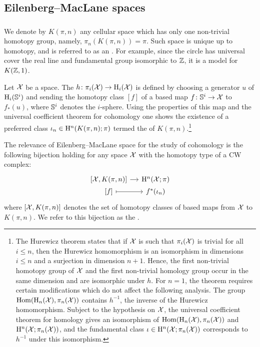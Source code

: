 \subsection{Eilenberg--MacLane spaces}

\subsubsection{}

We denote by $K(\pi, n)$ any cellular space which has only one non-trivial homotopy group, namely, $\pi_n(K(\pi, n)) = \pi$.
Such space is unique up to homotopy, and is referred to as an .
For example, since the circle has universal cover the real line and fundamental group isomorphic to $\mathbb{Z}$, it is a model for $K(\mathbb{Z},1)$.

Let $\mathcal{X}$ be a space.
The  $h \colon \pi_i(\mathcal{X}) \to \mathrm{H}_i(\mathcal{X})$ is defined by choosing a generator $u$ of $\mathrm{H}_i(\mathbb{S}^i)$ and sending the homotopy class $[f]$ of a based map $f \colon \mathbb{S}^i \to \mathcal{X}$ to $f_*(u)$, where $\mathbb{S}^i$ denotes the $i$-sphere.
Using the properties of this map and the universal coefficient theorem for cohomology one shows the existence of a preferred class $\iota_n \in \mathrm{H}^n(K(\pi, n); \pi)$ termed the  of $K(\pi, n)$.\footnote{The Hurewicz theorem states that if $\mathcal{X}$ is such that $\pi_i(\mathcal{X})$ is trivial for all $i \leq n$, then the Hurewicz homomorphism is an isomorphism in dimensions $i \leq n$ and a surjection in dimension $n+1$.
	Hence, the first non-trivial homotopy group of $\mathcal{X}$ and the first non-trivial homology group occur in the same dimension and are isomorphic under $h$.
	For $n=1$, the theorem requires certain modifications which do not affect the following analysis.
	The group $\mathrm{Hom}(\mathrm{H}_n(\mathcal{X}), \pi_n(\mathcal{X}))$ contains $h^{-1}$, the inverse of the Hurewicz homomorphism.
	Subject to the hypothesis on $\mathcal{X}$, the universal coefficient theorem for homology gives an isomorphism of $\mathrm{Hom}(\mathrm{H}_n(\mathcal{X}), \pi_n(\mathcal{X}))$ and $\mathrm{H}^n(\mathcal{X}; \pi_n(\mathcal{X}))$, and the fundamental class $\iota \in \mathrm{H}^n(\mathcal{X}; \pi_n(\mathcal{X}))$ corresponds to $h^{-1}$ under this isomorphism.}

The relevance of Eilenberg--MacLane space for the study of cohomology is the following bijection holding for any space \(\mathcal{X}\) with the homotopy type of a CW complex:
\[
\begin{tikzcd}[column sep=small, row sep=0]
	{[\cX, K(\pi, n)]} \rar & \rH^n(\cX; \pi) \\
	{[f]} \rar[maps to] & f^*(\iota_n)
\end{tikzcd}
\]
where $[\mathcal{X}, K(\pi, n)]$ denotes the set of homotopy classes of based maps from $\mathcal{X}$ to $K(\pi, n)$.
We refer to this bijection as the .

